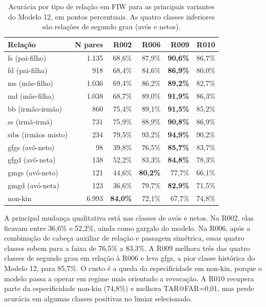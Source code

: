 \begin{table}[h]
\centering
\caption{Acurácia por tipo de relação em FIW para as principais variantes do Modelo 12, em pontos percentuais. As quatro classes inferiores são relações de segundo grau (avós e netos).}
\label{tab:per_rel_compare}
\begin{tabular}{lrrrrr}
\hline
\textbf{Relação} & \textbf{N pares} & \textbf{R002} & \textbf{R006} & \textbf{R009} & \textbf{R010} \\
\hline
fs (pai-filho)      & 1.135 & 68{,}6\% & 87{,}9\% & \textbf{90{,}6\%} & 86{,}7\% \\
fd (pai-filha)      & 918   & 68{,}4\% & 84{,}6\% & \textbf{86{,}9\%} & 80{,}0\% \\
ms (mãe-filho)      & 1.036 & 69{,}4\% & 86{,}2\% & \textbf{89{,}2\%} & 82{,}7\% \\
md (mãe-filha)      & 1.038 & 68{,}7\% & 89{,}0\% & \textbf{91{,}9\%} & 86{,}3\% \\
bb (irmão-irmão)    & 860   & 75{,}4\% & 89{,}1\% & \textbf{91{,}5\%} & 85{,}2\% \\
ss (irmã-irmã)      & 731   & 75{,}9\% & 88{,}9\% & \textbf{90{,}8\%} & 86{,}9\% \\
sibs (irmãos misto) & 234   & 79{,}5\% & 93{,}2\% & \textbf{94{,}9\%} & 90{,}2\% \\
\hline
gfgs (avô-neto)     & 98  & 39{,}8\% & 76{,}5\% & \textbf{85{,}7\%} & 83{,}7\% \\
gfgd (avô-neta)     & 138 & 52{,}2\% & 83{,}3\% & \textbf{84{,}8\%} & 78{,}3\% \\
gmgs (avó-neto)     & 121 & 44{,}6\% & \textbf{80{,}2\%} & 77{,}7\% & 66{,}1\% \\
gmgd (avó-neta)     & 123 & 36{,}6\% & 79{,}7\% & \textbf{82{,}9\%} & 71{,}5\% \\
\hline
non-kin             & 6.993 & \textbf{84{,}0\%} & 72{,}1\% & 67{,}7\% & 74{,}8\% \\
\hline
\end{tabular}
\end{table}

A principal mudança qualitativa está nas classes de avós e netos. Na R002, elas ficavam entre 36{,}6\% e 52{,}2\%, ainda como gargalo do modelo. Na R006, após a combinação de cabeça auxiliar de relação e passagem simétrica, essas quatro classes sobem para a faixa de 76{,}5\% a 83{,}3\%. A R009 melhora três das quatro classes de segundo grau em relação à R006 e leva gfgs, a pior classe histórica do Modelo 12, para 85{,}7\%. O custo é a queda da especificidade em non-kin, porque o modelo passa a operar em regime mais orientado a revocação. A R010 recupera parte da especificidade non-kin (74{,}8\%) e melhora TAR@FAR=0,01, mas perde acurácia em algumas classes positivas no limiar selecionado.

